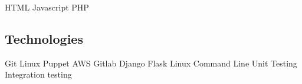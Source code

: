 \documentclass[letterpaper]{deedy-resume} %
\newcommand{\bul}{\textbullet{}}
\begin{document}
\begin{minipage}[t]{0.33\textwidth}

HTML \bul Javascript \bul PHP

\sectionspace %

\subsection{Technologies}

Git \bul Linux \bul Puppet \bul AWS \bul Gitlab \bul Django \bul Flask
\bul Linux Command Line \bul Unit Testing \bul Integration testing


\end{minipage} %
\hfill
%
%
\end{document}
